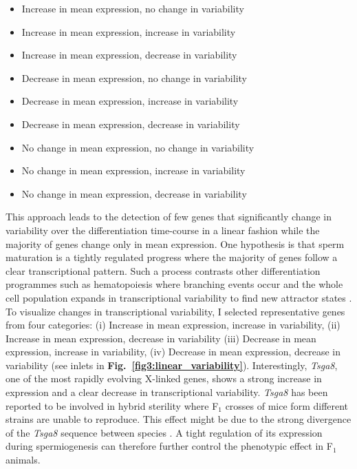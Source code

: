 \begin{itemize}
\itemsep0em 
\item Increase in mean expression, no change in variability
\item Increase in mean expression, increase in variability
\item Increase in mean expression, decrease in variability
\item Decrease in mean expression, no change in variability
\item Decrease in mean expression, increase in variability
\item Decrease in mean expression, decrease in variability
\item No change in mean expression, no change in variability
\item No change in mean expression, increase in variability
\item No change in mean expression, decrease in variability
\end{itemize}

This approach leads to the detection of few genes that significantly change in variability over the differentiation time-course in a linear fashion while the majority of genes change only in mean expression. One hypothesis is that sperm maturation is a tightly regulated progress where the majority of genes follow a clear transcriptional pattern. Such a process contrasts other differentiation programmes such as hematopoiesis where branching events occur and the whole cell population expands in transcriptional variability to find new attractor states \citep{Mojtahedi2016}. To visualize changes in transcriptional variability, I selected representative genes from four categories: (i) Increase in mean expression, increase in variability, (ii) Increase in mean expression, decrease in variability (iii) Decrease in mean expression, increase in variability, (iv) Decrease in mean expression, decrease in variability (see inlets in \textbf{Fig.~\ref{fig3:linear_variability}}). Interestingly, \textit{Tsga8}, one of the most rapidly evolving X-linked genes, shows a strong increase in expression and a clear decrease in transcriptional variability. \emph{Tsga8} has been reported to be involved in hybrid sterility where F$_1$ crosses of mice form different strains are unable to reproduce. This effect might be due to the strong divergence of the \emph{Tsga8} sequence between species \citep{Good2011}. A tight regulation of its expression during spermiogenesis can therefore further control the phenotypic effect in F$_1$ animals.

